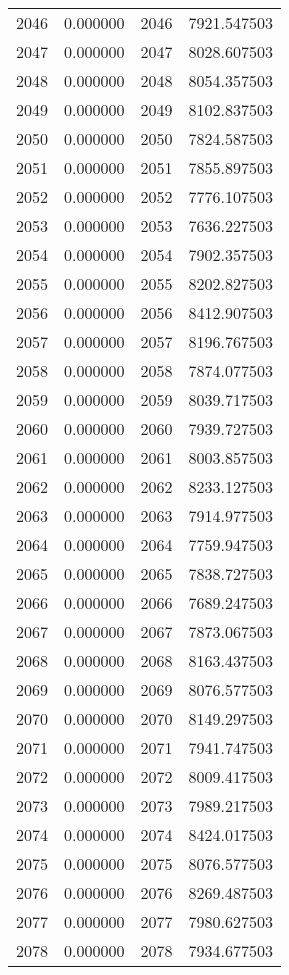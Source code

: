 \documentclass[12pt]{article}
\begin{document}
\begin{longtable}{@{}cccc@{}}
2046 & 0.000000 & 2046 & 7921.547503 \\
2047 & 0.000000 & 2047 & 8028.607503 \\
2048 & 0.000000 & 2048 & 8054.357503 \\
2049 & 0.000000 & 2049 & 8102.837503 \\
2050 & 0.000000 & 2050 & 7824.587503 \\
2051 & 0.000000 & 2051 & 7855.897503 \\
2052 & 0.000000 & 2052 & 7776.107503 \\
2053 & 0.000000 & 2053 & 7636.227503 \\
2054 & 0.000000 & 2054 & 7902.357503 \\
2055 & 0.000000 & 2055 & 8202.827503 \\
2056 & 0.000000 & 2056 & 8412.907503 \\
2057 & 0.000000 & 2057 & 8196.767503 \\
2058 & 0.000000 & 2058 & 7874.077503 \\
2059 & 0.000000 & 2059 & 8039.717503 \\
2060 & 0.000000 & 2060 & 7939.727503 \\
2061 & 0.000000 & 2061 & 8003.857503 \\
2062 & 0.000000 & 2062 & 8233.127503 \\
2063 & 0.000000 & 2063 & 7914.977503 \\
2064 & 0.000000 & 2064 & 7759.947503 \\
2065 & 0.000000 & 2065 & 7838.727503 \\
2066 & 0.000000 & 2066 & 7689.247503 \\
2067 & 0.000000 & 2067 & 7873.067503 \\
2068 & 0.000000 & 2068 & 8163.437503 \\
2069 & 0.000000 & 2069 & 8076.577503 \\
2070 & 0.000000 & 2070 & 8149.297503 \\
2071 & 0.000000 & 2071 & 7941.747503 \\
2072 & 0.000000 & 2072 & 8009.417503 \\
2073 & 0.000000 & 2073 & 7989.217503 \\
2074 & 0.000000 & 2074 & 8424.017503 \\
2075 & 0.000000 & 2075 & 8076.577503 \\
2076 & 0.000000 & 2076 & 8269.487503 \\
2077 & 0.000000 & 2077 & 7980.627503 \\
2078 & 0.000000 & 2078 & 7934.677503 \\

\end{longtable}
\end{document}

